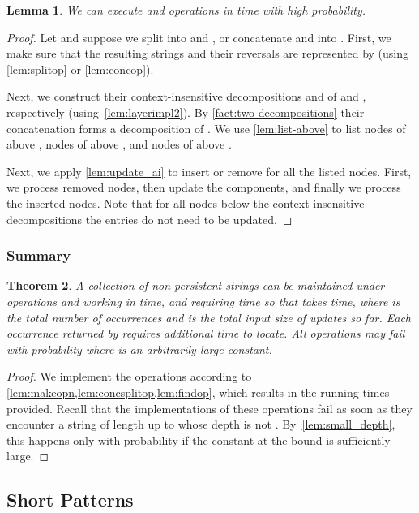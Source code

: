 \documentclass[a4paper]{article}
\newtheorem{theorem}{Theorem}[section]
\newtheorem{lemma}[theorem]{Lemma}
\theoremstyle{remark}
\begin{document}
\begin{lemma}\label{lem:concsplitop}
We can execute  and  operations in 
time with high probability.
\end{lemma}
\begin{proof}
Let  and suppose we split  into  and , or concatenate  and  into .
First, we make sure that the resulting strings and their reversals are represented by 
(using \cref{lem:splitop} or \cref{lem:concop}).

Next, we construct their context-insensitive decompositions  and  of  and , respectively (using~\cref{lem:layerimpl2}).
By \cref{fact:two-decompositions} their concatenation  forms a decomposition of .
We use \cref{lem:list-above} to list nodes of  above , nodes of  above , and nodes of 
above .

Next, we apply \cref{lem:update_ai} to insert or remove  for all the listed nodes.
First, we process removed nodes, then update the  components, and finally we process the inserted nodes.
Note that for all nodes  below the context-insensitive decompositions the  entries do not need to be updated.
\end{proof}

\subsubsection{Summary}
\begin{theorem}\label{thm:long}
A collection of non-persistent strings can be maintained under operations  and 
working in  time,  and  requiring  time
so that  takes  time, where  is the total
number of occurrences and  is the total input size of updates so far.
Each occurrence returned by  requires additional  time to locate.
All operations may fail with probability  where  is an arbitrarily large constant.
\end{theorem}
\begin{proof}
We implement the operations according to \cref{lem:makeopn,lem:concsplitop,lem:findop}, which results
in the running times provided. Recall that the implementations of these operations fail as soon as
they encounter a string of length up to  whose depth is not . By~\cref{lem:small_depth},
this happens only with probability  if the constant at the  bound is sufficiently large.
\end{proof}
\subsection{Short Patterns}\label{sec:short}
\end{document}
